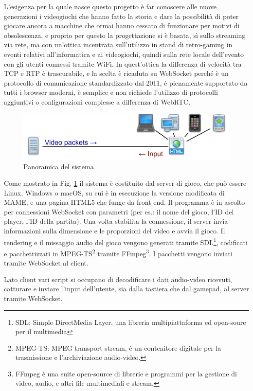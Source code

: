 L'esigenza per la quale nasce questo progetto è far conoscere alle nuove generazioni i videogiochi che hanno fatto la storia e dare la possibilità di poter giocare ancora a macchine che ormai hanno cessato di funzionare per motivi di obsolescenza, e proprio per questo la progettazione si è basata, sì sullo streaming via rete, ma con un'ottica incentrata sull'utilizzo in stand di retro-gaming in eventi relativi all'informatica e ai videogiochi, quindi sulla rete locale dell'evento con gli utenti connessi tramite WiFi. In quest'ottica la differenza di velocità tra TCP e RTP è trascurabile, e la scelta è ricaduta su WebSocket perché è un protocollo di comunicazione standardizzato dal 2011, è pienamente supportato da tutti i browser moderni, è semplice e non richiede l'utilizzo di protocolli aggiuntivi o configurazioni complesse a differenza di WebRTC.

\begin{figure}[H]
	\includegraphics[width=\linewidth]{immagini/proposed_system}
	\caption{Panoramica del sistema}
	\label{fig:proposed_system}
\end{figure}

Come mostrato in Fig. \ref{fig:proposed_system} il sistema è costituito dal server di gioco, che può essere Linux, Windows o macOS, su cui è in esecuzione la versione modificata di MAME, e una pagina HTML5 che funge da front-end. Il programma è in ascolto per connessioni WebSocket con parametri (per es.: il nome del gioco, l'ID del player, l'ID della partita). Una volta stabilita la connessione, il server invia informazioni sulla dimensione e le proporzioni del video e avvia il gioco. Il rendering e il missaggio audio del gioco vengono generati tramite SDL\footnote{SDL: Simple DirectMedia Layer, una libreria multipiattaforma ed open-soure per il multimedia}, codificati e pacchettizzati in MPEG-TS\footnote{MPEG-TS: MPEG transport stream, è un contenitore digitale per la trasmissione e l'archiviazione audio-video.} tramite FFmpeg\footnote{FFmpeg è una suite open-source di librerie e programmi per la gestione di video, audio, e altri file multimediali e stream.}. I pacchetti vengono inviati tramite WebSocket al client.

Lato client vari script si occupano di decodificare i dati audio-video ricevuti, catturare e inviare l'input dell'utente, sia dalla tastiera che dal gamepad, al server tramite WebSocket.

